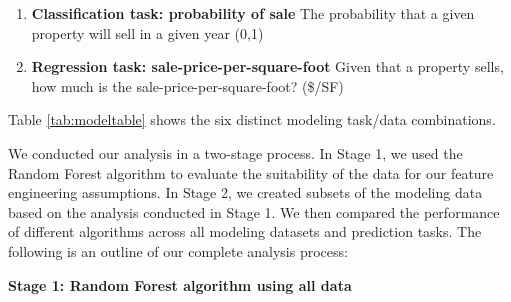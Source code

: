 \documentclass[12pt,]{article}
\providecommand{\tightlist}{%
  \setlength{\itemsep}{0pt}\setlength{\parskip}{0pt}}
\begin{document}
\begin{enumerate}
\def\labelenumi{\arabic{enumi})}
\tightlist
\item
  \textbf{Classification task: probability of sale} The probability that
  a given property will sell in a given year (0,1)
\item
  \textbf{Regression task: sale-price-per-square-foot} Given that a
  property sells, how much is the sale-price-per-square-foot? (\$/SF)
\end{enumerate}

\noindent Table \ref{tab:modeltable} shows the six distinct modeling
task/data combinations.

\begin{table}

\caption{\label{tab:model table}\label{tab:modeltable} Six Predictive Models}
\centering
{}
\end{table}

We conducted our analysis in a two-stage process. In Stage 1, we used
the Random Forest algorithm to evaluate the suitability of the data for
our feature engineering assumptions. In Stage 2, we created subsets of
the modeling data based on the analysis conducted in Stage 1. We then
compared the performance of different algorithms across all modeling
datasets and prediction tasks. The following is an outline of our
complete analysis process:\newline

\noindent \textbf{Stage 1: Random Forest algorithm using all data}
\end{document}
